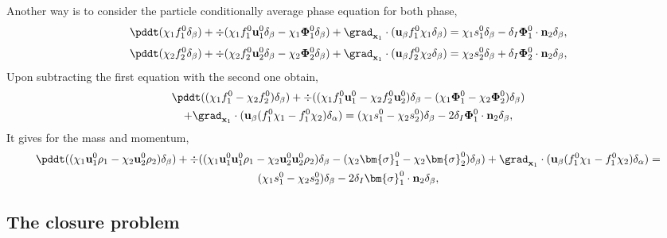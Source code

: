 Another way is to consider the particle conditionally average phase equation for both phase, 
\begin{equation*}
    \pddt (\chi_1 f_1^0 \delta_{\beta})
    + \div (
        \chi_1 f_1^0 \textbf{u}_1^0 \delta_{\beta}
        - \chi_1 \mathbf{\Phi}_1^0  \delta_{\beta}
        )
    + \grad_{\textbf{x}_1}\cdot (\textbf{u}_\beta f^0_1\chi_1\delta_\beta)
    = 
    \chi_1 s_1^0 \delta_{\beta}
    - 
    \delta_I
    \mathbf{\Phi}_1^0
    \cdot \textbf{n}_2  \delta_{\beta},
\end{equation*}
\begin{equation*}
    \pddt (\chi_2 f_2^0 \delta_{\beta})
    + \div (
        \chi_2 f_2^0 \textbf{u}_2^0 \delta_{\beta}
        - \chi_2 \mathbf{\Phi}_2^0  \delta_{\beta}
        )
    + \grad_{\textbf{x}_1}\cdot (\textbf{u}_\beta f^0_2\chi_2\delta_\beta)
    = 
    \chi_2 s_2^0 \delta_{\beta}
    + 
    \delta_I
    \mathbf{\Phi}_2^0
    \cdot \textbf{n}_2  \delta_{\beta},
\end{equation*}
Upon subtracting the first equation with the second one obtain, 
\begin{multline*}
    \pddt ((\chi_1 f_1^0 -\chi_2 f_2^0) \delta_{\beta})
    + \div (
        (\chi_1 f_1^0\textbf{u}_1^0  -\chi_2 f_2^0\textbf{u}_2^0 ) \delta_{\beta}
        - (\chi_1 \mathbf{\Phi}_1^0-\chi_2 \mathbf{\Phi}_2^0)  \delta_{\beta}
        )\\
    + \grad_{\textbf{x}_1}\cdot (\textbf{u}_\beta (f^0_1\chi_1 - f^0_1\chi_2)\delta_\alpha)
    = 
    (\chi_1 s_1^0 - \chi_2 s_2^0) \delta_{\beta}
    - 2
    \delta_I
    \mathbf{\Phi}_1^0
    \cdot \textbf{n}_2  \delta_{\beta},
\end{multline*}
It gives for the mass and momentum, 
\begin{multline*}
    \pddt ((\chi_1 \textbf{u}_1^0\rho_1 -\chi_2 \textbf{u}_2^0 \rho_2) \delta_{\beta})
    + \div (
        (\chi_1 \textbf{u}_1^0 \textbf{u}_1^0\rho_1 
        - \chi_2 \textbf{u}_2^0 \textbf{u}_2^0\rho_2) \delta_{\beta}
        - (\chi_2\bm{\sigma}_1^0  -\chi_2\bm{\sigma}_2^0  )\delta_{\beta}
        )
    + \grad_{\textbf{x}_1}\cdot (\textbf{u}_\beta (f^0_1\chi_1 - f^0_1\chi_2)\delta_\alpha)
    = \\
    (\chi_1 s_1^0 - \chi_2 s_2^0) \delta_{\beta}
    - 2
    \delta_I
    \bm{\sigma}_1^0
    \cdot \textbf{n}_2  \delta_{\beta},
\end{multline*}



\subsection*{The closure problem}

